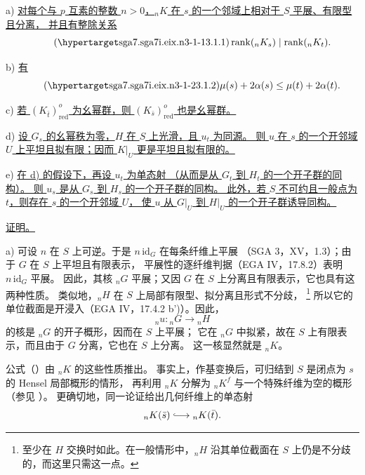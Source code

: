 \smallskip
\noindent
a) \underline{对每个与 $p$ 互素的整数 $n>0$，${}_nK$ 在 $s$ 的一个邻域上相对于 $S$ 平展、有限型且分离，
并且有整除关系}
\begin{equation}\tag{\SGARefTarget{sga7.sga7i.eix.n3-1-1}{3.1.1}}
 \operatorname{rank}({}_nK_s)\mid \operatorname{rank}({}_nK_t).
\end{equation}

\noindent
b) \underline{有}
\begin{equation}\tag{\SGARefTarget{sga7.sga7i.eix.n3-1-2}{3.1.2}}
 \mu(s)+2\alpha(s)\leq \mu(t)+2\alpha(t).
\end{equation}

\noindent
c) \underline{若 $(K_{\bar t})^o_{\mathrm{red}}$ 为幺幂群，则 $(K_{\bar s})^o_{\mathrm{red}}$ 也是幺幂群。}

\smallskip
\noindent
d) \underline{设 $G_s$ 的幺幂秩为零，$H$ 在 $S$ 上光滑，且 $u_t$ 为同源。
则 $u$ 在 $s$ 的一个开邻域 $U$ 上平坦且拟有限；因而 $K|_U$ 更是平坦且拟有限的。}

\smallskip
\noindent
e) \underline{在 d) 的假设下，再设 $u_t$ 为单态射
（从而是从 $G_t$ 到 $H_t$ 的一个开子群的同构）。
则 $u_s$ 是从 $G_s$ 到 $H_s$ 的一个开子群的同构。
此外，若 $S$ 不可约且一般点为 $t$，则存在 $s$ 的一个开邻域 $U$，
使 $u$ 从 $G|_U$ 到 $H|_U$ 的一个开子群诱导同构。}

\medskip
\noindent
\underline{证明。}

\smallskip
\noindent
a) 可设 $n$ 在 $S$ 上可逆。于是 $n\,\mathrm{id}_G$ 在每条纤维上平展
（SGA 3，XV，1.3）；由于 $G$ 在 $S$ 上平坦且有限表示，
平展性的逐纤维判据（EGA IV，17.8.2）表明 $n\,\mathrm{id}_G$ 平展。
因此，其核 ${}_nG$ 平展；又因 $G$ 在 $S$ 上分离且有限表示，它也具有这两种性质。
类似地，${}_nH$ 在 $S$ 上局部有限型、拟分离且形式不分歧，
\footnote{至少在 $H$ 交换时如此。在一般情形中，${}_nH$ 沿其单位截面在 $S$ 上仍是不分歧的，而这里只需这一点。}
所以它的单位截面是开浸入（EGA IV，17.4.2 b')）。因此，
\[
 {}_nu:{}_nG\longrightarrow {}_nH
\]
的核是 ${}_nG$ 的开子概形，因而在 $S$ 上平展；
它在 ${}_nG$ 中拟紧，故在 $S$ 上有限表示，而且由于 $G$ 分离，它也在 $S$ 上分离。
这一核显然就是 ${}_nK$。

公式（）由 ${}_nK$ 的这些性质推出。
事实上，作基变换后，可归结到 $S$ 是闭点为 $s$ 的 Hensel 局部概形的情形，
再利用 ${}_nK$ 分解为 ${}_nK^f$ 与一个特殊纤维为空的概形（参见 ）。
更确切地，同一论证给出几何纤维上的单态射
\[
 {}_nK(\bar s)\lhook\joinrel\longrightarrow {}_nK(\bar t).
\]


